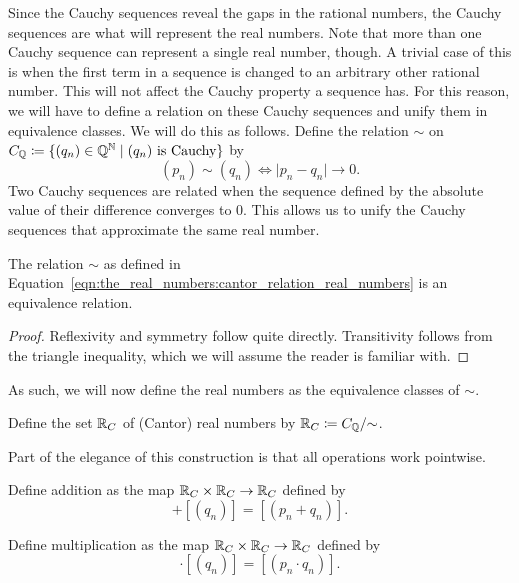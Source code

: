 \documentclass[../main.tex]{subfiles}
\begin{document}
Since the Cauchy sequences reveal the gaps in the rational numbers, the Cauchy sequences are what will represent the real numbers. Note that more than one Cauchy sequence can represent a single real number, though. A trivial case of this is when the first term in a sequence is changed to an arbitrary other rational number. This will not affect the Cauchy property a sequence has. For this reason, we will have to define a relation on these Cauchy sequences and unify them in equivalence classes. We will do this as follows. Define the relation $\sim$ on $C_{\mathbb{Q}}\coloneq\{(q_n)\in\mathbb{Q}^{\mathbb{N}}\mid(q_n)\text{ is Cauchy}\}$ by
\begin{equation}\label{eqn:the_real_numbers:cantor_relation_real_numbers}
    (p_n)\sim(q_n)\iff\vert p_n-q_n\vert\to0.
\end{equation}
Two Cauchy sequences are related when the sequence defined by the absolute value of their difference converges to $0$. This allows us to unify the Cauchy sequences that approximate the same real number.
\begin{lemma}
    The relation $\sim$ as defined in Equation~\eqref{eqn:the_real_numbers:cantor_relation_real_numbers} is an equivalence relation.
\end{lemma}
\begin{proof}
    Reflexivity and symmetry follow quite directly. Transitivity follows from the triangle inequality, which we will assume the reader is familiar with.
\end{proof}
As such, we will now define the real numbers as the equivalence classes of $\sim$.
\begin{definition}
    Define the set $\mathbb{R}_C$ of (Cantor) real numbers by $\mathbb{R}_C\coloneq C_{\mathbb{Q}}/{\sim}$.
\end{definition}
Part of the elegance of this construction is that all operations work pointwise.
\begin{definition}
    Define addition as the map $\mathbb{R}_C\times\mathbb{R}_C\to\mathbb{R}_C$ defined by
    \begin{equation*}
        [(p_n)]+[(q_n)]=[(p_n+q_n)].
    \end{equation*}
\end{definition}
\begin{definition}
    Define multiplication as the map $\mathbb{R}_C\times\mathbb{R}_C\to\mathbb{R}_C$ defined by
    \begin{equation*}
        [(p_n)]\cdot[(q_n)]=[(p_n\cdot q_n)].
    \end{equation*}
\end{definition}
\end{document}
